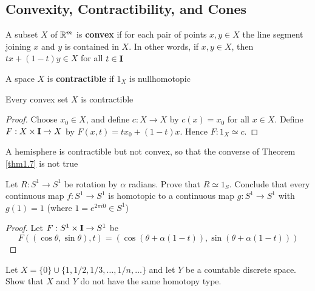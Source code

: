 \documentclass[11pt]{article}
\begin{document}
\subsection{Convexity, Contractibility, and Cones}
\label{sec:orgafeb14d}
\begin{definition}[]
A subset \(X\) of \(\mathbb{R}^m\) is \textbf{convex} if for each pair of points \(x,y\in X\) the line segment
joining \(x\) and \(y\) is contained in \(X\). In other words, if \(x,y\in X\),
then \(tx+(1-t)y\in X\) for all \(t\in\operatorname{\textbf{I}}\)
\end{definition}

\begin{definition}[]
A space \(X\) is \textbf{contractible} if \(1_X\) is nullhomotopic
\end{definition}

\begin{theorem}[]
\label{thm1.7}
Every convex set \(X\) is contractible
\end{theorem}

\begin{proof}
Choose \(x_0\in X\), and define \(c:X\to X\) by \(c(x)=x_0\) for all \(x\in X\). Define \(F:X\times\operatorname{\textbf{I}}\to X\)
by \(F(x,t)=tx_0+(1-t)x\). Hence \(F:1_X\simeq c\).
\end{proof}

A hemisphere is contractible but not convex, so that the converse of Theorem \ref{thm1.7} is not
true

\begin{exercise}
\label{ex1.3}
Let \(R:S^1\to S^1\) be rotation by \(\alpha\) radians. Prove that \(R\simeq 1_S\). Conclude that every continuous
map \(f:S^1\to S^1\) is homotopic to a continuous map \(g:S^1\to S^1\) with \(g(1)=1\)
(where \(1=e^{2\pi i0}\in S^1\))
\end{exercise}

\begin{proof}
Let \(F:S^1\times\operatorname{\textbf{I}}\to S^1\) be
\begin{equation*}
F((\cos\theta,\sin\theta),t)=(\cos(\theta+\alpha(1-t)),\sin(\theta+\alpha(1-t)))
\end{equation*}
\end{proof}

\begin{exercise}
\label{ex1.5}
\label{Problem2}
Let \(X=\{0\}\cup\{1,1/2,1/3,\dots,1/n,\dots\}\) and let \(Y\) be a countable discrete space. Show that \(X\)
and \(Y\) do not have the same homotopy type.
\end{exercise}
\end{document}
